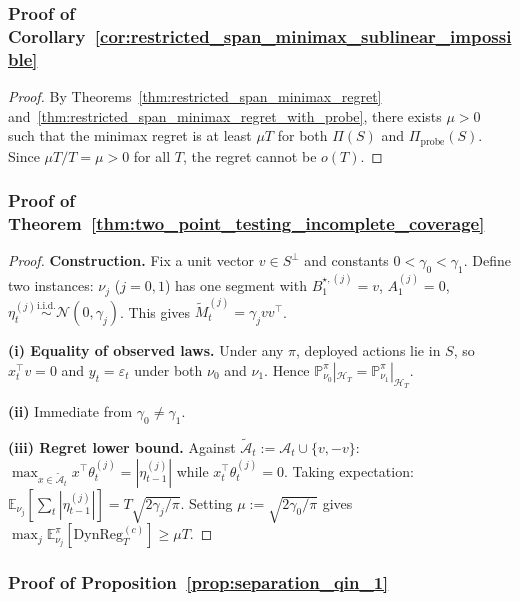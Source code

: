\documentclass{article}
\newcommand{\E}{\mathbb{E}}
\newcommand{\Prob}{\mathbb{P}}
\newcommand{\cA}{\mathcal{A}}
\newcommand{\cH}{\mathcal{H}}
\newcommand{\DynReg}{\mathrm{DynReg}}
\begin{document}
\subsubsection{Proof of Corollary~\ref{cor:restricted_span_minimax_sublinear_impossible}}
\label{proof:restricted_span_minimax_sublinear_impossible}

\begin{proof}
By Theorems~\ref{thm:restricted_span_minimax_regret} and~\ref{thm:restricted_span_minimax_regret_with_probe}, there exists $\mu > 0$ such that the minimax regret is at least $\mu T$ for both $\Pi(S)$ and $\Pi_{\mathrm{probe}}(S)$.
Since $\mu T / T = \mu > 0$ for all $T$, the regret cannot be $o(T)$.
\end{proof}

\subsubsection{Proof of Theorem~\ref{thm:two_point_testing_incomplete_coverage}}
\label{proof:two_point_testing_incomplete_coverage}

\begin{proof}
\textbf{Construction.}
Fix a unit vector $v \in S^\perp$ and constants $0 < \gamma_0 < \gamma_1$.
Define two instances: $\nu_j$ ($j=0,1$) has one segment with $B_1^{\star,(j)} = v$, $A_1^{(j)} = 0$, $\eta_t^{(j)} \stackrel{\mathrm{i.i.d.}}{\sim} \mathcal{N}(0, \gamma_j)$.
This gives $\widetilde M_t^{(j)} = \gamma_j v v^\top$.

\textbf{(i) Equality of observed laws.}
Under any $\pi$, deployed actions lie in $S$, so $x_t^\top v = 0$ and $y_t = \varepsilon_t$ under both $\nu_0$ and $\nu_1$.
Hence $\Prob_{\nu_0}^\pi|_{\cH_T} = \Prob_{\nu_1}^\pi|_{\cH_T}$.

\textbf{(ii)} Immediate from $\gamma_0 \neq \gamma_1$.

\textbf{(iii) Regret lower bound.}
Against $\widetilde{\cA}_t := \cA_t \cup \{v, -v\}$: $\max_{x \in \widetilde{\cA}_t} x^\top \theta_t^{(j)} = |\eta_{t-1}^{(j)}|$ while $x_t^\top \theta_t^{(j)} = 0$.
Taking expectation: $\E_{\nu_j}[\sum_t |\eta_{t-1}^{(j)}|] = T\sqrt{2\gamma_j/\pi}$.
Setting $\mu := \sqrt{2\gamma_0/\pi}$ gives $\max_j \E_{\nu_j}^\pi[\DynReg_T^{(c)}] \ge \mu T$.
\end{proof}

\subsubsection{Proof of Proposition~\ref{prop:separation_qin_1}}
\label{proof:separation_qin_1}
\end{document}
